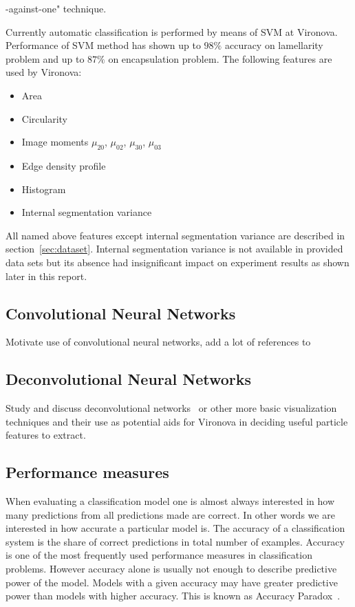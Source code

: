\documentclass[a4paper, 11pt, table]{article}
\begin{document}
-against-one" technique.

Currently automatic classification is performed by means of SVM at Vironova. Performance of SVM method has shown up to $98\%$ accuracy on lamellarity problem and up to $87\%$ on encapsulation problem. The following features are used by Vironova:
\begin{itemize}
\item Area
\item Circularity
\item Image moments $\mu_{20}$, $\mu_{02}$, $\mu_{30}$, $\mu_{03}$
\item Edge density profile
\item Histogram
\item Internal segmentation variance
\end{itemize}

All named above features except internal segmentation variance are described in section~\ref{sec:dataset}. Internal segmentation variance is not available in provided data sets but its absence had insignificant impact on experiment results as shown later in this report.  

\subsection{Convolutional Neural Networks}
Motivate use of convolutional neural networks, add a lot of references to~\cite{dl_book}

\subsection{Deconvolutional Neural Networks}
Study and discuss deconvolutional networks~\cite{DBLP:journals/corr/ZeilerF13} or other more basic visualization techniques and their use as potential aids for Vironova in deciding useful particle features to extract.

\subsection{Performance measures}

When evaluating a classification model one is almost always interested in how many predictions from all predictions made are correct. In other words we are interested in how accurate a particular model is. The accuracy of a classification system is the share of correct predictions in total number of examples. Accuracy  is one of the most frequently used performance measures in classification problems. However accuracy alone is usually not enough to describe predictive power of the model. Models with a given accuracy may have greater predictive power than models with higher accuracy. This is known as Accuracy Paradox~\cite{zhu2007knowledge}.
\end{document}
